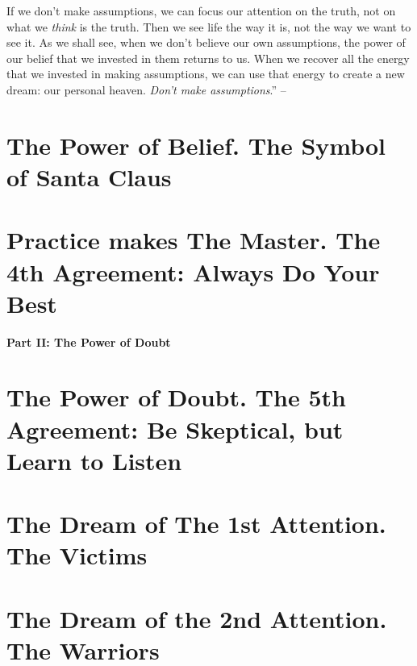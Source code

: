 \documentclass{article}
\numberwithin{equation}{section}
\begin{document}
If we don't make assumptions, we can focus our attention on the truth, not on what we \textit{think} is the truth. Then we see life the way it is, not the way we want to see it. As we shall see, when we don't believe our own assumptions, the power of our belief that we invested in them returns to us. When we recover all the energy that we invested in making assumptions, we can use that energy to create a new dream: our personal heaven. \textit{Don't make assumptions}.'' -- \cite[pp. 55--57]{Ruiz_Ruiz2011}


\section{The Power of Belief. The Symbol of Santa Claus}


\section{Practice makes The Master. The 4th Agreement: Always Do Your Best}


\begin{center}\Large\bf
	Part II: The Power of Doubt
\end{center}

\section{The Power of Doubt. The 5th Agreement: Be Skeptical, but Learn to Listen}


\section{The Dream of The 1st Attention. The Victims}


\section{The Dream of the 2nd Attention. The Warriors}
\end{document}
